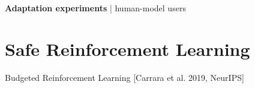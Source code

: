 \documentclass{beamer}
\begin{document}
    \begin{frame}{\textbf{Adaptation experiments} | human-model users}
        \begin{figure}
            \captionsetup[subfigure]{labelformat=empty}
            \begin{center}
            \end{center}
        \end{figure}
    \end{frame}




    \section{Safe Reinforcement Learning}

    \begin{frame}
        Budgeted Reinforcement Learning [Carrara et al. 2019, NeurIPS]
    \end{frame}
\end{document}
